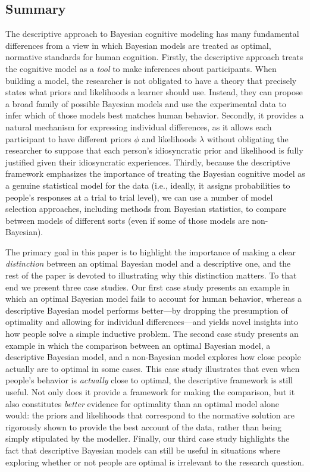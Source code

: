 \subsection*{Summary}

The descriptive approach to Bayesian cognitive modeling has many fundamental differences from a view in which Bayesian models are treated as optimal, normative standards for human cognition. Firstly, the descriptive approach treats the cognitive model as a {\it tool} to make inferences about participants. When building a model, the researcher is not obligated to have a theory that precisely states what priors and likelihoods a learner should use. Instead, they can propose a broad family of possible Bayesian models and use the experimental data to infer which of those models best matches human behavior. Secondly, it provides a natural mechanism for expressing individual differences, as it allows each participant to have different priors $\phi$ and likelihoods $\lambda$ without obligating the researcher to suppose that each person's idiosyncratic prior and likelihood is fully justified given their idiosyncratic experiences. Thirdly, because the descriptive framework emphasizes the importance of treating the Bayesian cognitive model as a genuine statistical model for the data (i.e., ideally, it assigns probabilities to people's responses at a trial to trial level), we can use a number of model selection approaches, including methods from Bayesian statistics, to compare between models of different sorts (even if some of those models are non-Bayesian). 

The primary goal in this paper is to highlight the importance of making a clear {\it distinction} between an optimal Bayesian model and a descriptive one, and the rest of the paper is devoted to illustrating why this distinction matters. To that end we present three case studies. Our first case study presents an example in which an optimal Bayesian model fails to account for human behavior, whereas a descriptive Bayesian model performs better---by dropping the presumption of optimality and allowing for individual differences---and yields novel insights into how people solve a simple inductive problem. The second case study presents an example in which the comparison between an optimal Bayesian model, a descriptive Bayesian model, and a non-Bayesian model explores how close people actually are to optimal in some cases. This case study illustrates that even when people's behavior is {\it actually} close to optimal, the descriptive framework is still useful. Not only does it provide a framework for making the  comparison, but it also constitutes {\it better} evidence for optimality than an optimal model alone would: the priors and likelihoods that correspond to the normative solution are rigorously shown to provide the best account of the data, rather than being simply stipulated by the modeller. Finally, our third case study highlights the fact that descriptive Bayesian models can still be useful in situations where exploring whether or not people are optimal is irrelevant to the research question.


